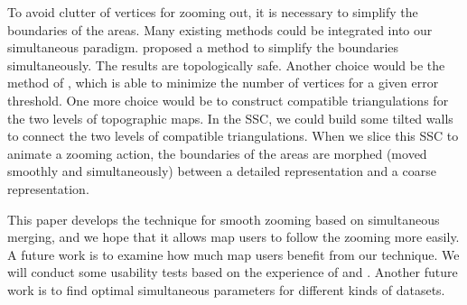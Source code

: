 \documentclass[twocolumn]{svjour3}          %
\begin{document}
To avoid clutter of vertices for zooming out, 
it is necessary to simplify the boundaries of the areas.
Many existing methods could be integrated into our simultaneous paradigm.
\citet{Meijers2011LineSimp} proposed a method 
to simplify the boundaries simultaneously. 
The results are topologically safe. 
Another choice would be the method of \citet{ImaiIri1988},
which is able to minimize the number of vertices 
for a given error threshold.
One more choice would be to construct compatible triangulations 
\citep[see][]{Peng2019Thesis}
for the two levels of topographic maps.
In the SSC, we could build some tilted walls 
to connect the two levels of compatible triangulations.
When we slice this SSC to animate a zooming action,
the boundaries of the areas are morphed 
(moved smoothly and simultaneously)
between a detailed representation and a coarse representation.



This paper develops the technique for smooth zooming based on simultaneous merging,
and we hope that it allows map users to follow the zooming more easily.
A future work is to examine 
how much map users benefit from our technique.
We will conduct some usability tests based on the experience of
\citet[]{Suba2017Thesis} and \citet{Midtbo2007}.
Another future work is to find optimal simultaneous parameters for 
different kinds of datasets.



\end{document}
